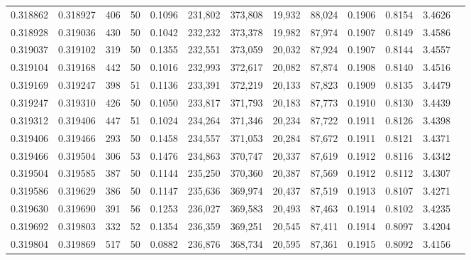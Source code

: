 \begin{tabular}{rrrrrrrrrrrrr}
0.318862 & 0.318927 &   406 &  50 &                                     0.1096 & 231,802 & 373,808 &  19,932 &  88,024 & 0.1906 & 0.8154 & 3.4626 \\
0.318928 & 0.319036 &   430 &  50 &                                     0.1042 & 232,232 & 373,378 &  19,982 &  87,974 & 0.1907 & 0.8149 & 3.4586 \\
0.319037 & 0.319102 &   319 &  50 &                                     0.1355 & 232,551 & 373,059 &  20,032 &  87,924 & 0.1907 & 0.8144 & 3.4557 \\
0.319104 & 0.319168 &   442 &  50 &                                     0.1016 & 232,993 & 372,617 &  20,082 &  87,874 & 0.1908 & 0.8140 & 3.4516 \\
0.319169 & 0.319247 &   398 &  51 &                                     0.1136 & 233,391 & 372,219 &  20,133 &  87,823 & 0.1909 & 0.8135 & 3.4479 \\
0.319247 & 0.319310 &   426 &  50 &                                     0.1050 & 233,817 & 371,793 &  20,183 &  87,773 & 0.1910 & 0.8130 & 3.4439 \\
0.319312 & 0.319406 &   447 &  51 &                                     0.1024 & 234,264 & 371,346 &  20,234 &  87,722 & 0.1911 & 0.8126 & 3.4398 \\
0.319406 & 0.319466 &   293 &  50 &                                     0.1458 & 234,557 & 371,053 &  20,284 &  87,672 & 0.1911 & 0.8121 & 3.4371 \\
0.319466 & 0.319504 &   306 &  53 &                                     0.1476 & 234,863 & 370,747 &  20,337 &  87,619 & 0.1912 & 0.8116 & 3.4342 \\
0.319504 & 0.319585 &   387 &  50 &                                     0.1144 & 235,250 & 370,360 &  20,387 &  87,569 & 0.1912 & 0.8112 & 3.4307 \\
0.319586 & 0.319629 &   386 &  50 &                                     0.1147 & 235,636 & 369,974 &  20,437 &  87,519 & 0.1913 & 0.8107 & 3.4271 \\
0.319630 & 0.319690 &   391 &  56 &                                     0.1253 & 236,027 & 369,583 &  20,493 &  87,463 & 0.1914 & 0.8102 & 3.4235 \\
0.319692 & 0.319803 &   332 &  52 &                                     0.1354 & 236,359 & 369,251 &  20,545 &  87,411 & 0.1914 & 0.8097 & 3.4204 \\
0.319804 & 0.319869 &   517 &  50 &                                     0.0882 & 236,876 & 368,734 &  20,595 &  87,361 & 0.1915 & 0.8092 & 3.4156 \\

\end{tabular}
